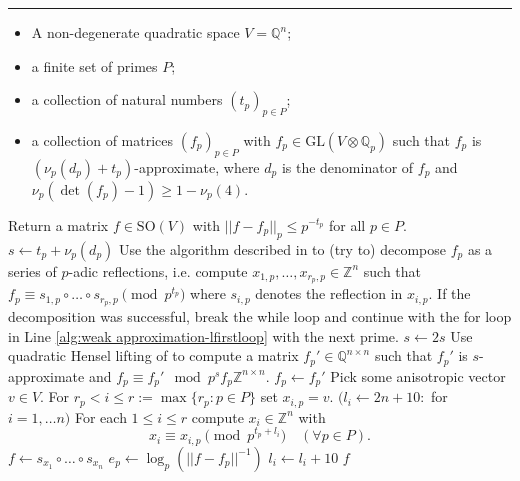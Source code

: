 \documentclass[11pt,letterpaper]{amsart}
\newcommand{\QQ}{\mathbb{Q}}
\newcommand{\ZZ}{\mathbb{Z}}
\theoremstyle{definition}
\theoremstyle{remark}
\begin{document}
\begingroup
{}\label{alg:weak approximation}
\endgroup
\hrule
\begin{algorithmic}[1]
\REQUIRE \hfill
\begin{itemize}
    \item A non-degenerate quadratic space $V=\QQ^n$; 
    \item a finite set of primes $P$;
\item a collection of natural numbers $(t_p)_{p \in P}$;
\item a collection of matrices $(f_p)_{p \in P}$ with $f_p\in \mathrm{GL}(V \otimes \QQ_p)$ 
such that $f_p$ is $(\nu_p(d_p)+t_p)$-approximate, where $d_p$ is the denominator of $f_p$ and $\nu_p(\det(f_p)-1)\geq 1-\nu_p(4)$.
\end{itemize}
\ENSURE Return a matrix $f \in \mathrm{SO}(V)$ with $||f - f_p||_p \leq p^{-t_p}$ for all $p \in P$.
\label{alg:weak approximation-lfirstloop}
  \STATE $s \gets t_p+\nu_p(d_p)$
  \STATE Use the algorithm described in \cite[Lemma 5.8]{shimada.connected.components} to (try to) decompose $f_p$ as a series of $p$-adic reflections, i.e. compute $x_{1,p},\dots ,x_{r_p,p} \in \ZZ^n$ such that $f_p \equiv s_{1,p} \circ \dots \circ s_{r_p,p} \pmod{ p^{t_p}}$ where $s_{i,p}$ denotes the reflection in $x_{i,p}$. \label{alg:weak approximation-lshimada} If the decomposition was successful, break the while loop and continue with the for loop in Line \ref{alg:weak approximation-lfirstloop} with the next prime. 
  \STATE $s \gets 2s$
  \STATE Use quadratic Hensel lifting of \cite[Algorithm 3]{brandhorst.veniani.hensel-lifting} to compute a matrix $f_p' \in \QQ^{n \times n}$ such that $f_p'$ is $s$-approximate and $f_p \equiv f_p' \mod p^s f_p \ZZ^{n \times n}$.  
  \STATE $f_p \gets f_p'$
  \ENDWHILE
\ENDFOR
\STATE Pick some anisotropic vector $v \in V$.
\STATE For $r_p<i\leq r:=\max\{r_p : p \in P\}$ set $x_{i,p}=v$. \label{alg:weak-approximation.padding}
\STATE $(l_i \gets 2n+10 \colon$  for $i = 1,\dots n)$
\REPEAT
    \STATE For each $1 \leq i \leq r$ compute $x_i \in \ZZ^n$ with \[x_i \equiv x_{i,p} \pmod{p^{t_p+l_i}} \quad ( \forall p \in P).\]
    \vspace*{-4mm}
    \STATE $f\gets s_{x_1} \circ \dots \circ s_{x_n}$
        \STATE $e_p \gets \log_p(||f - f_p||^{-1})$
        \STATE $l_i\gets l_i+10$
        \ENDIF
    \ENDFOR
{}
\RETURN $f$
\end{algorithmic}\hrulefill\\
\end{document}
